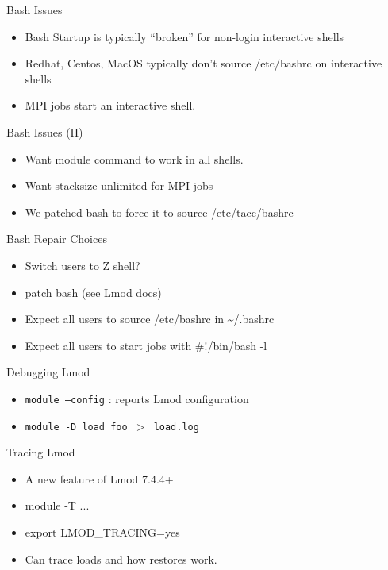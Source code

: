 \documentclass{beamer}
\begin{document}
\begin{frame}{Bash Issues}
  \begin{itemize}
    \item Bash Startup is typically ``broken'' for non-login interactive shells
    \item Redhat, Centos, MacOS typically don't source /etc/bashrc on interactive shells
    \item MPI jobs start an interactive shell.
  \end{itemize}
\end{frame}

\begin{frame}{Bash Issues (II)}
  \begin{itemize}
    \item Want module command to work in all shells.
    \item Want stacksize unlimited for MPI jobs
    \item We patched bash to force it to source /etc/tacc/bashrc
  \end{itemize}
\end{frame}

\begin{frame}{Bash Repair Choices}
  \begin{itemize}
    \item Switch users to Z shell?
    \item patch bash (see Lmod docs)
    \item Expect all users to source /etc/bashrc in \textasciitilde/.bashrc
    \item Expect all users to start jobs with \#!/bin/bash -l
  \end{itemize}
\end{frame}

\begin{frame}{Debugging Lmod}
  \begin{itemize}
    \item \texttt{module --config} : reports Lmod configuration
    \item \texttt{module -D load foo $>$ load.log}
  \end{itemize}
\end{frame}

\begin{frame}{Tracing Lmod}
  \begin{itemize}
    \item A new feature of Lmod 7.4.4+
    \item module -T ...
    \item export LMOD\_TRACING=yes
    \item Can trace loads and how restores work.
  \end{itemize}
\end{frame}
\end{document}
